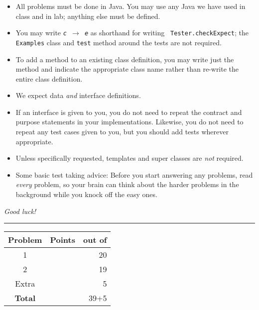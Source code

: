 \documentclass[12pt]{article}                   %
\begin{document}
\noindent\begin{minipage}{8cm}\sloppy
\begin{itemize}

\item All problems must be done in Java. You may use any Java we have
  used in class and in lab; anything else must be defined.

\item You may write {\tt {\slshape c} $\rightarrow$ {\slshape e}} as
  shorthand for writing {\tt
    Tester.checkExpect}; the {\tt Examples} class and {\tt test}
  method around the tests are not required.

\item To add a method to an existing class definition, you
  may write just the method and indicate the appropriate class name
  rather than re-write the entire class definition.

\item We expect data \emph{and} interface definitions.

\item If an interface is given to you, you do not need to repeat the
  contract and purpose statements in your implementations.  Likewise,
  you do not need to repeat any test cases given to you, but you
  should add tests wherever appropriate.



\item Unless specifically requested, templates and super classes are
  \emph{not} required.

\item Some basic test taking advice: Before you start answering
any problems, read \emph{every} problem, so your brain can  think
about the harder problems in the background while you knock off the easy ones.
\end{itemize}
\bigskip

\emph{Good luck!}
\end{minipage}\hfil\begin{minipage}[t]{6cm}
\rule{1cm}{0pt}\begin{tabular}{|c|l|@{/}r|}
\hline
{\bf Problem} & Points & out of \\ \hline
1 & & 20\\ \hline
2 & & 19\\ \hline
Extra & & 5 \\ \hline
{\bf Total} & & 39+5 \\ \hline
\end{tabular}
\end{minipage}
\end{document}
